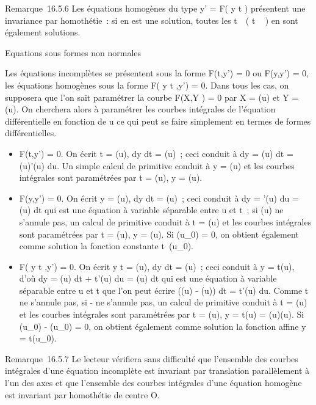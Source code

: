 Remarque~16.5.6 Les équations homogènes du type y' = F( y
\over t ) présentent une invariance par homothétie~: si
\phi en est une solution, toutes les
t\mapsto~\lambda~\phi\left ( t
\over \lambda~ \right ) en sont également
solutions.

Equations sous formes non normales

Les équations incomplètes se présentent sous la forme F(t,y') = 0 ou
F(y,y') = 0, les équations homogènes sous la forme F( y
\over t ,y') = 0. Dans tous les cas, on supposera que
l'on sait paramétrer la courbe F(X,Y ) = 0 par X = \phi(u) et Y = \psi(u). On
cherchera alors à paramétrer les courbes intégrales de l'équation
différentielle en fonction de u ce qui peut se faire simplement en
termes de formes différentielles.

\begin{itemize}
\itemsep1pt\parskip0pt
\item
  F(t,y') = 0. On écrit t = \phi(u),  dy \over dt =
  \psi(u)~; ceci conduit à dy = \psi(u) dt = \psi(u)\phi'(u) du. Un simple calcul de
  primitive conduit à y = \Psi(u) et les courbes intégrales sont
  paramétrées par t = \phi(u), y = \Psi(u).
\item
  F(y,y') = 0. On écrit y = \phi(u),  dy \over dt =
  \psi(u)~; ceci conduit à dy = \phi'(u) du = \psi(u) dt qui est une équation à
  variable séparable entre u et t~; si \psi(u) ne s'annule pas, un calcul
  de primitive conduit à t = \Phi(u) et les courbes intégrales sont
  paramétrées par t = \Phi(u), y = \psi(u). Si \phi(u_0) = 0, on obtient
  également comme solution la fonction constante
  t\mapsto~\phi(u_0).
\item
  F( y \over t ,y') = 0. On écrit  y
  \over t = \phi(u),  dy \over dt =
  \psi(u)~; ceci conduit à y = t\phi(u), d'où dy = \phi(u) dt + t\phi'(u) du = \psi(u)
  dt qui est une équation à variable séparable entre u et t que l'on
  peut écrire (\psi(u) - \phi(u)) dt = t\phi'(u) du. Comme t ne s'annule pas, si
  \psi - \phi ne s'annule pas, un calcul de primitive conduit à t = \Phi(u) et
  les courbes intégrales sont paramétrées par t = \Phi(u), y = t\psi(u) =
  \Phi(u)\psi(u). Si \psi(u_0) - \phi(u_0) = 0, on obtient
  également comme solution la fonction affine y = t\phi(u_0).
\end{itemize}

Remarque~16.5.7 Le lecteur vérifiera sans difficulté que l'ensemble des
courbes intégrales d'une équation incomplète est invariant par
translation parallèlement à l'un des axes et que l'ensemble des courbes
intégrales d'une équation homogène est invariant par homothétie de
centre O.

